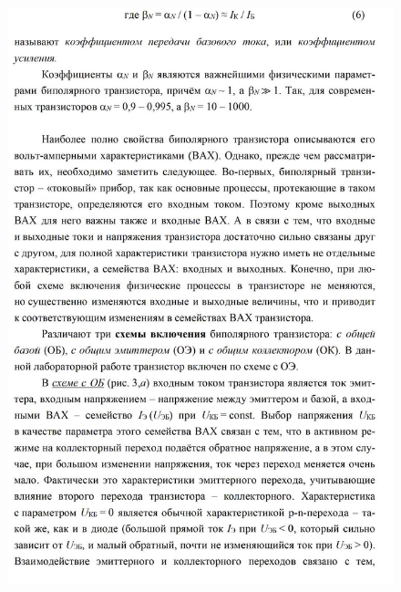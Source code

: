\documentclass[a4paper,14pt]{article}
\begin{document}
\begin{figure}[H]
	\centering
	\includegraphics[width=\linewidth]{images/theory_4}
	\caption*{}
	\label{fig:theory4}
\end{figure}
\end{document}

